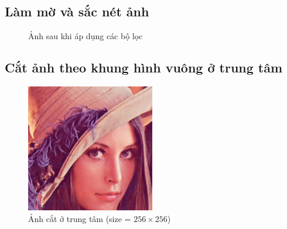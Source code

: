 \subsection{Làm mờ và sắc nét ảnh}

\begin{figure}[H]
	\centering
	\hfill
	\caption{Ảnh sau khi áp dụng các bộ lọc}
\end{figure}

\subsection{Cắt ảnh theo khung hình vuông ở trung tâm}

\begin{figure}[H]
	\centering
	\includegraphics[width=0.5\textwidth]{imgs/lena_crop_center.png}
	\caption{Ảnh cắt ở trung tâm (size = \(256 \times 256\))}
\end{figure}

